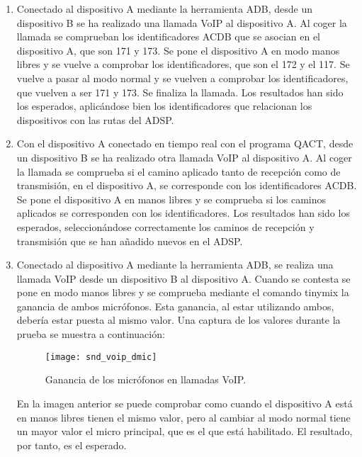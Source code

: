 \begin{enumerate}
	\item Conectado al dispositivo A mediante la herramienta \gls{ADB}, desde un dispositivo B se ha realizado una llamada \gls{VoIP} al dispositivo A. Al coger la llamada se comprueban los identificadores \gls{ACDB} que se asocian en el dispositivo A, que son 171 y 173. Se pone el dispositivo A en modo manos libres y se vuelve a comprobar los identificadores, que son el 172 y el 117. Se vuelve a pasar al modo normal y se vuelven a comprobar los identificadores, que vuelven a ser 171 y 173. Se finaliza la llamada. Los resultados han sido los esperados, aplicándose bien los identificadores que relacionan los dispositivos con las rutas del \gls{ADSP}.
	\item Con el dispositivo A conectado en tiempo real con el programa \gls{QACT}, desde un dispositivo B se ha realizado otra llamada \gls{VoIP} al dispositivo A. Al coger la llamada se comprueba si el camino aplicado tanto de recepción como de transmisión, en el dispositivo A, se corresponde con los identificadores \gls{ACDB}. Se pone el dispositivo A en manos libres y se comprueba si los caminos aplicados se corresponden con los identificadores. Los resultados han sido los esperados, seleccionándose correctamente los caminos de recepción y transmisión que se han añadido nuevos en el \gls{ADSP}.
	\item Conectado al dispositivo A mediante la herramienta \gls{ADB}, se realiza una llamada \gls{VoIP} desde un dispositivo B al dispositivo A. Cuando se contesta se pone en modo manos libres y se comprueba mediante el comando tinymix la ganancia de ambos micrófonos. Esta ganancia, al estar utilizando ambos, debería estar puesta al mismo valor. Una captura de los valores durante la prueba se muestra a continuación:
	\begin{figure}[H]
		\centering
		\texttt{[image: snd\_voip\_dmic]}
		\caption{Ganancia de los micrófonos en llamadas VoIP.} 
		\label{fig:snd_voip_dmic}
	\end{figure}
	En la imagen anterior se puede comprobar como cuando el dispositivo A está en manos libres tienen el mismo valor, pero al cambiar al modo normal tiene un mayor valor el micro principal, que es el que está habilitado. El resultado, por tanto, es el esperado.
\end{enumerate}